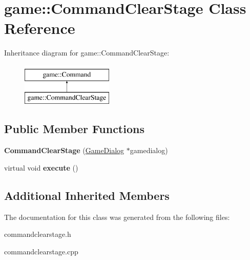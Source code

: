 \hypertarget{classgame_1_1CommandClearStage}{}\section{game\+:\+:Command\+Clear\+Stage Class Reference}
\label{classgame_1_1CommandClearStage}
Inheritance diagram for game\+:\+:Command\+Clear\+Stage\+:\begin{figure}[H]
\begin{center}
\leavevmode
\includegraphics[height=2.000000cm]{classgame_1_1CommandClearStage}
\end{center}
\end{figure}
\subsection*{Public Member Functions}
\begin{DoxyCompactItemize}
\item 
\mbox{\label{classgame_1_1CommandClearStage_a1e7dafd0c15118746360bfd95d22815f}} 
{\bfseries Command\+Clear\+Stage} (\hyperlink{classgame_1_1GameDialog}{Game\+Dialog} $\ast$gamedialog)
\item 
\mbox{\label{classgame_1_1CommandClearStage_ab53d909ad9c842f3c04710fb59abc308}} 
virtual void {\bfseries execute} ()
\end{DoxyCompactItemize}
\subsection*{Additional Inherited Members}


The documentation for this class was generated from the following files\+:\begin{DoxyCompactItemize}
\item 
commandclearstage.\+h\item 
commandclearstage.\+cpp\end{DoxyCompactItemize}
